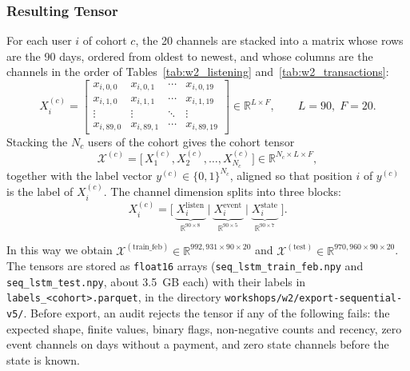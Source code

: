 \documentclass{article}
\newcommand{\R}{\mathbb{R}}
\begin{document}
\subsubsection{Resulting Tensor}

For each user $i$ of cohort $c$, the 20 channels are stacked into a matrix whose rows are the 90 days, ordered from oldest to newest, and whose columns are the channels in the order of Tables~\ref{tab:w2_listening} and~\ref{tab:w2_transactions}:
\begin{equation}
X_i^{(c)} =
\begin{bmatrix}
x_{i,0,0}  & x_{i,0,1}  & \cdots & x_{i,0,19} \\
x_{i,1,0}  & x_{i,1,1}  & \cdots & x_{i,1,19} \\
\vdots     & \vdots     & \ddots & \vdots \\
x_{i,89,0} & x_{i,89,1} & \cdots & x_{i,89,19}
\end{bmatrix}
\in \R^{L \times F}, \qquad L = 90,\; F = 20 .
\end{equation}
Stacking the $N_c$ users of the cohort gives the cohort tensor
\begin{equation}
\mathcal{X}^{(c)} = \big[\, X_1^{(c)}, X_2^{(c)}, \dots, X_{N_c}^{(c)} \,\big] \in \R^{N_c \times L \times F},
\end{equation}
together with the label vector $y^{(c)} \in \{0,1\}^{N_c}$, aligned so that position $i$ of $y^{(c)}$ is the label of $X_i^{(c)}$. The channel dimension splits into three blocks:
\begin{equation}
X_i^{(c)} = \big[\; \underbrace{X_i^{\text{listen}}}_{\R^{90 \times 8}} \;\big|\; \underbrace{X_i^{\text{event}}}_{\R^{90 \times 5}} \;\big|\; \underbrace{X_i^{\text{state}}}_{\R^{90 \times 7}} \;\big].
\end{equation}

In this way we obtain $\mathcal{X}^{(\text{train\_feb})} \in \R^{992{,}931 \times 90 \times 20}$ and $\mathcal{X}^{(\text{test})} \in \R^{970{,}960 \times 90 \times 20}$. The tensors are stored as \texttt{float16} arrays (\texttt{seq\_lstm\_train\_feb.npy} and \texttt{seq\_lstm\_test.npy}, about 3.5~GB each) with their labels in \texttt{labels\_<cohort>.parquet}, in the directory \texttt{workshops/w2/export-sequential-v5/}. Before export, an audit rejects the tensor if any of the following fails: the expected shape, finite values, binary flags, non-negative counts and recency, zero event channels on days without a payment, and zero state channels before the state is known.
\end{document}
